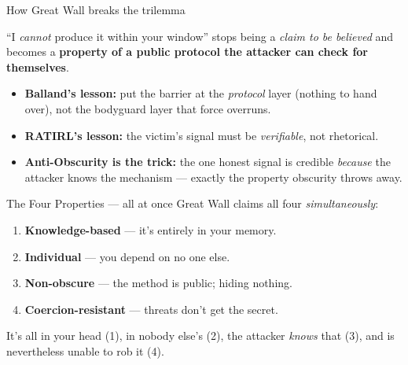 \documentclass[aspectratio=169,11pt]{beamer}
\begin{document}
\begin{frame}{How Great Wall breaks the trilemma}
  \begin{keyidea}
    ``I \emph{cannot} produce it within your window'' stops being a \emph{claim to
    be believed} and becomes a \textbf{property of a public protocol the attacker
    can check for themselves}.
  \end{keyidea}
  \vspace{2pt}
  \begin{itemize}\small
    \item \textbf{Balland's lesson:} put the barrier at the \emph{protocol} layer
      (nothing to hand over), not the bodyguard layer that force overruns.
    \item \textbf{RATIRL's lesson:} the victim's signal must be \emph{verifiable},
      not rhetorical.
    \item \textbf{Anti-Obscurity is the trick:} the one honest signal is credible
      \emph{because} the attacker knows the mechanism --- exactly the property
      obscurity throws away.
  \end{itemize}
\end{frame}


\begin{frame}{The Four Properties --- all at once}
  Great Wall claims all four \emph{simultaneously}:
  \begin{enumerate}
    \item \textbf{Knowledge-based} --- it's entirely in your memory.
    \item \textbf{Individual} --- you depend on no one else.
    \item \textbf{Non-obscure} --- the method is public; hiding nothing.
    \item \textbf{Coercion-resistant} --- threats don't get the secret.
  \end{enumerate}
  \vspace{6pt}
  \begin{keyidea}
    It's all in your head (1), in nobody else's (2), the attacker \emph{knows}
    that (3), and is nevertheless unable to rob it (4).
  \end{keyidea}
\end{frame}
\end{document}
